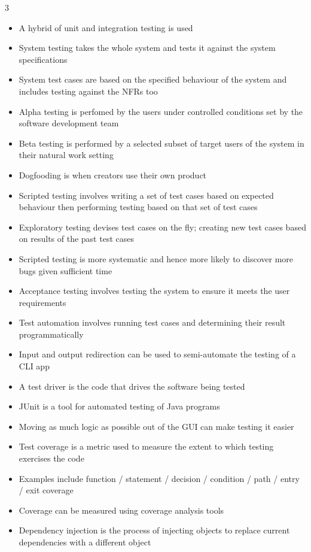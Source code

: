\documentclass[10pt, landscape]{article}
\begin{document}
\begin{multicols*}{3}
\begin{itemize}
    \item A hybrid of unit and integration testing is used
    \item System testing takes the whole system and tests it against the system specifications
    \item System test cases are based on the specified behaviour of the system and includes testing against the NFRs too
    \item Alpha testing is perfomed by the users under controlled conditions set by the software development team
    \item Beta testing is performed by a selected subset of target users of the system in their natural work setting
    \item Dogfooding is when creators use their own product
    \item Scripted testing involves writing a set of test cases based on expected behaviour then performing testing based on that set of test cases
    \item Exploratory testing devises test cases on the fly; creating new test cases based on results of the past test cases
    \item Scripted testing is more systematic and hence more likely to discover more bugs given sufficient time
    \item Acceptance testing involves testing the system to ensure it meets the user requirements
    \item Test automation involves running test cases and determining their result programmatically
    \item Input and output redirection can be used to semi-automate the testing of a CLI app
    \item A test driver is the code that drives the software being tested
    \item JUnit is a tool for automated testing of Java programs
    \item Moving as much logic as possible out of the GUI can make testing it easier
    \item Test coverage is a metric used to measure the extent to which testing exercises the code
    \item Examples include function / statement / decision / condition / path / entry / exit coverage
    \item Coverage can be measured using coverage analysis tools
    \item Dependency injection is the process of injecting objects to replace current dependencies with a different object

\end{itemize}
\end{multicols*}
\end{document}
